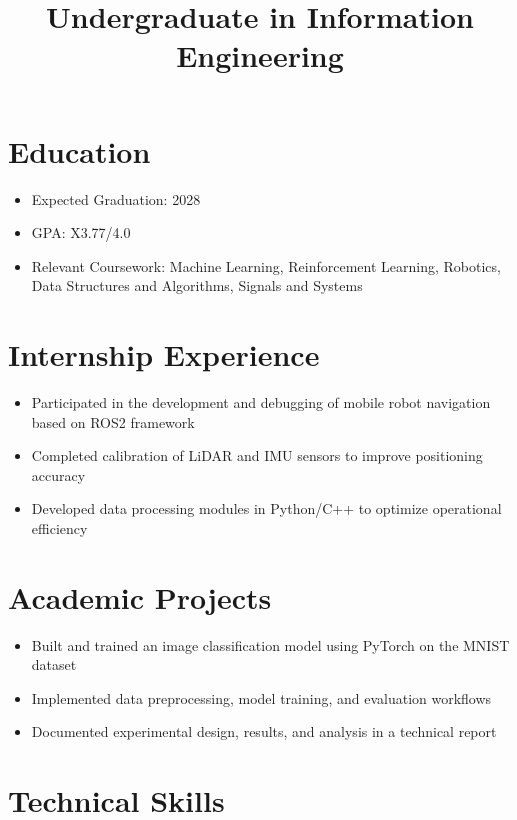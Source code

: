 \documentclass[11pt,a4paper,sans]{moderncv}
\title{Undergraduate in Information Engineering}
\begin{document}
\makecvtitle

\section{Education}
{
\begin{itemize}
    \item Expected Graduation: 2028
    \item GPA: X3.77/4.0
    \item Relevant Coursework: Machine Learning, Reinforcement Learning, Robotics, Data Structures and Algorithms, Signals and Systems
\end{itemize}
}

\section{Internship Experience}
{
\begin{itemize}
    \item Participated in the development and debugging of mobile robot navigation based on ROS2 framework
    \item Completed calibration of LiDAR and IMU sensors to improve positioning accuracy
    \item Developed data processing modules in Python/C++ to optimize operational efficiency
\end{itemize}
}

\section{Academic Projects}
{
\begin{itemize}
    \item Built and trained an image classification model using PyTorch on the MNIST dataset
    \item Implemented data preprocessing, model training, and evaluation workflows
    \item Documented experimental design, results, and analysis in a technical report
\end{itemize}
}

\section{Technical Skills}
\end{document}
